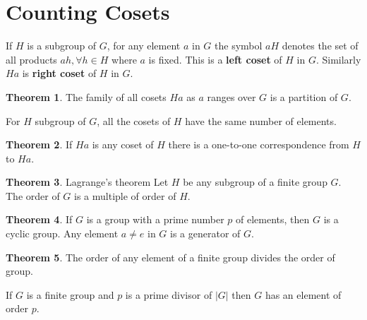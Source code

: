 \documentclass[a4paper,12pt]{article}
\theoremstyle{definition}
\theoremstyle{axiom}
\theoremstyle{theorem}
\newtheorem{theorem}{Theorem}[section]
\theoremstyle{lemma}
\begin{document}
\section{Counting Cosets}
If $H$ is a subgroup of $G$, for any element $a$ in $G$ the symbol $aH$ denotes the set of all products $ah, \forall h \in H$ where $a$ is fixed. This is a \textbf{left coset} of $H$ in $G$. Similarly $Ha$ is \textbf{right coset} of $H$ in $G$.
\begin{theorem}{}
    The family of all cosets $Ha$ as $a$ ranges over $G$ is a partition of $G$.
\end{theorem}
For $H$ subgroup of $G$, all the cosets of $H$ have the same number of elements.
\begin{theorem}{}
    If $Ha$ is any coset of $H$ there is a one-to-one correspondence from $H$ to $Ha$.
\end{theorem}
\begin{theorem}{Lagrange's theorem}
        Let $H$ be any subgroup of a finite group $G$. The order of $G$ is a multiple of order of $H$.
\end{theorem}
\begin{theorem}{}
    If $G$ is a group with a prime number $p$ of elements, then $G$ is a cyclic group. Any element $a \neq e$ in $G$ is a generator of $G$.
\end{theorem}
\begin{theorem}{}
        The order of any element of a finite group divides the order of group.
\end{theorem}
If $G$ is a finite group and $p$ is a prime divisor of $|G|$ then $G$ has an element of order $p$.
\end{document}
